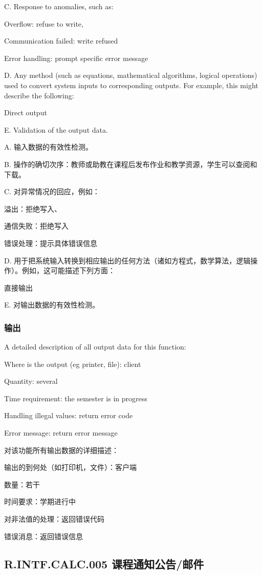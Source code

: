 C. Response to anomalies, such as:

Overflow: refuse to write,

Communication failed: write refused

Error handling: prompt specific error message

D. Any method (such as equations, mathematical algorithms, logical operations) used to convert system inputs to corresponding outputs. For example, this might describe the following:

Direct output

E. Validation of the output data.

A. 输入数据的有效性检测。

B. 操作的确切次序：教师或助教在课程后发布作业和教学资源，学生可以查阅和下载。

C. 对异常情况的回应，例如：

	溢出：拒绝写入、

	通信失败：拒绝写入
	
	错误处理：提示具体错误信息

D. 用于把系统输入转换到相应输出的任何方法（诸如方程式，数学算法，逻辑操作）。例如，这可能描述下列方面：

	直接输出

E.	对输出数据的有效性检测。
\subsubsection{输出}

A detailed description of all output data for this function:

Where is the output (eg printer, file): client

Quantity: several

Time requirement: the semester is in progress

Handling illegal values: return error code

Error message: return error message

对该功能所有输出数据的详细描述：

	输出的到何处（如打印机，文件）：客户端
	
	数量：若干
	
	时间要求：学期进行中
	
	对非法值的处理：返回错误代码
	
	错误消息：返回错误信息

\subsection{R.INTF.CALC.005 课程通知公告/邮件}
